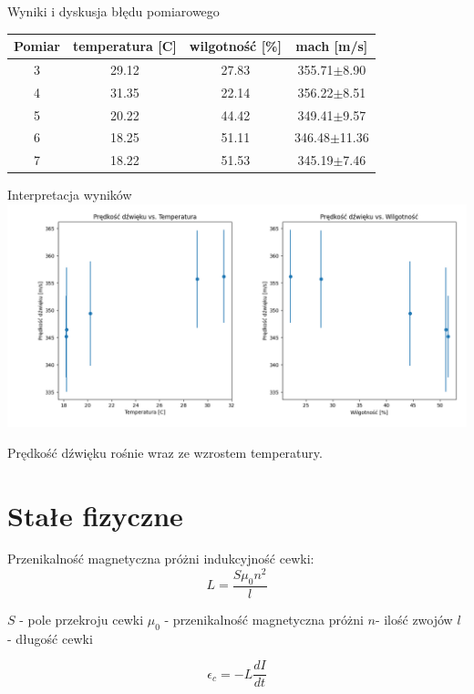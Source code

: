 \documentclass{beamer}
\begin{document}
\begin{frame}{Wyniki i dyskusja błędu pomiarowego}
	\centering
	\begin{tabular}{cccc}
		\toprule
		Pomiar & temperatura [C] & wilgotność [\%] & mach [m/s]       \\
		\midrule
		3      & 29.12           & 27.83           & 355.71$\pm$8.90  \\
		4      & 31.35           & 22.14           & 356.22$\pm$8.51  \\
		5      & 20.22           & 44.42           & 349.41$\pm$9.57  \\
		6      & 18.25           & 51.11           & 346.48$\pm$11.36 \\
		7      & 18.22           & 51.53           & 345.19$\pm$7.46  \\
		\bottomrule
	\end{tabular}

\end{frame}

\begin{frame}{Interpretacja wyników}
	\includegraphics[width=\linewidth]{temp_humid_mach.png}

	Prędkość dźwięku rośnie wraz ze wzrostem temperatury.
\end{frame}


\section{Stałe fizyczne}

\begin{frame}{Przenikalność magnetyczna próżni}
	indukcyjność cewki:
	$$L = \frac{S\mu_0 n^2}{l}$$

	$S$ - pole przekroju cewki
	$\mu_0$ - przenikalność magnetyczna próżni
	$n$- ilość zwojów
	$l$ - długość cewki

	$$\epsilon_c = -L\frac{dI}{dt}$$

\end{frame}
\end{document}
